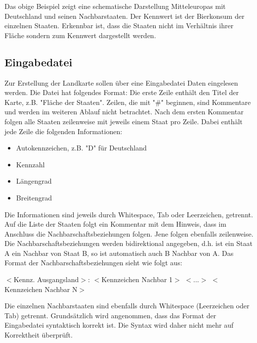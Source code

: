 \documentclass[a4paper,11pt]{article}
\newcommand*{\mybox}[2]{\colorbox{#1!30}{\parbox{.98\linewidth}{#2}}}
\begin{document}
{Das obige Beispiel zeigt eine schematische Darstellung Mitteleuropas mit Deutschland und seinen Nachbarstaaten. Der Kennwert ist der Bierkonsum der einzelnen Staaten. Erkennbar ist, dass die Staaten nicht im Verh\"altnis
ihrer Fl\"ache sondern zum Kennwert dargestellt werden.
\subsection{Eingabedatei}
Zur Erstellung der Landkarte sollen \"uber eine Eingabedatei Daten eingelesen werden. Die Datei hat folgendes Format:
Die erste Zeile enth\"alt den Titel der Karte, z.B. "Fl\"ache der Staaten".
Zeilen, die mit "\#" beginnen, sind Kommentare und werden im weiteren Ablauf nicht betrachtet.
Nach dem ersten Kommentar folgen alle Staaten zeilenweise mit jeweils einem Staat pro Zeile. Dabei enth\"alt jede Zeile die folgenden Informationen:
\begin{itemize}
\item Autokennzeichen, z.B. "D" f\"ur Deutschland
\item Kennzahl
\item L\"angengrad
\item Breitengrad
\end{itemize}
Die Informationen sind jeweils durch Whitespace, Tab oder Leerzeichen, getrennt.
Auf die Liste der Staaten folgt ein Kommentar mit dem Hinweis, dass im Anschluss die Nachbarschaftsbeziehungen folgen. Jene folgen ebenfalls zeilenweise.
Die Nachbarschaftsbeziehungen werden bidirektional angegeben, d.h. ist ein Staat A ein Nachbar von Staat B, so ist automatisch auch B Nachbar von A.
Das Format der Nachbarschaftsbeziehungen sieht wie folgt aus:
\mybox{background}{$<$Kennz. Ausgangsland$>$: $<$Kennzeichen Nachbar 1$>$ $<$...$>$ $<$Kennzeichen Nachbar N$>$}
Die einzelnen Nachbarstaaten sind ebenfalls durch Whitespace (Leerzeichen oder Tab) getrennt. 
Grundsätzlich wird angenommen, dass das Format der Eingabedatei syntaktisch korrekt ist. Die Syntax wird daher nicht mehr auf Korrektheit \"uberpr\"uft.

\vspace{10mm}

}
\end{document}
